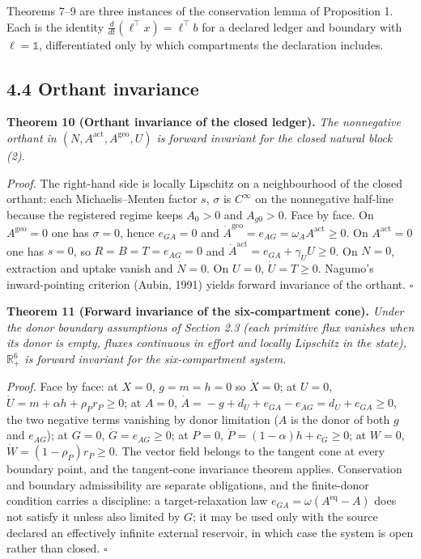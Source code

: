 \documentclass[11pt]{article}
\begin{document}
Theorems 7--9 are three instances of the conservation lemma of Proposition 1. Each is the identity \(\tfrac{d}{dt}(\ell^{\top}x)=\allowbreak{}\ell^{\top}b\) for a declared ledger and boundary with \(\ell=\mathbb 1\), differentiated only by which compartments the declaration includes.

\subsection*{4.4 Orthant invariance}\label{44-orthant-invariance}

\textbf{Theorem 10 (Orthant invariance of the closed ledger).} \emph{The nonnegative orthant in \((N,\allowbreak{} A^{\mathrm{act}},\allowbreak{} A^{\mathrm{geo}},\allowbreak{} U)\) is forward invariant for the closed natural block (2).}

\emph{Proof.} The right-hand side is locally Lipschitz on a neighbourhood of the closed orthant: each Michaelis--Menten factor \(s\), \(\sigma\) is \(C^\infty\) on the nonnegative half-line because the registered regime keeps \(A_0 > 0\) and \(A_{g0} > 0\). Face by face. On \(A^{\mathrm{geo}} = 0\) one has \(\sigma = 0\), hence \(e_{GA} = 0\) and \(\dot A^{\mathrm{geo}} =\allowbreak{} e_{AG} =\allowbreak{} \omega_A A^{\mathrm{act}} \ge 0\). On \(A^{\mathrm{act}} = 0\) one has \(s = 0\), so \(R = B = T = e_{AG} = 0\) and \(\dot A^{\mathrm{act}} =\allowbreak{} e_{GA} +\allowbreak{} \gamma_U U \ge 0\). On \(N = 0\), extraction and uptake vanish and \(\dot N = 0\). On \(U = 0\), \(\dot U = T \ge 0\). Nagumo's inward-pointing criterion (Aubin, 1991) yields forward invariance of the orthant. \(\square\)

\textbf{Theorem 11 (Forward invariance of the six-compartment cone).} \emph{Under the donor boundary assumptions of Section 2.3 (each primitive flux vanishes when its donor is empty, fluxes continuous in effort and locally Lipschitz in the state), \(\mathbb{R}^6_+\) is forward invariant for the six-compartment system.}

\emph{Proof.} Face by face: at \(X = 0\), \(g = m = h = 0\) so \(\dot X = 0\); at \(U = 0\), \(\dot U =\allowbreak{} m +\allowbreak{} \alpha h +\allowbreak{} \rho_P r_P \ge 0\); at \(A = 0\), \(\dot A =\allowbreak{} -g +\allowbreak{} d_U +\allowbreak{} e_{GA} - e_{AG} =\allowbreak{} d_U +\allowbreak{} e_{GA} \ge 0\), the two negative terms vanishing by donor limitation (\(A\) is the donor of both \(g\) and \(e_{AG}\)); at \(G = 0\), \(\dot G = e_{AG} \ge 0\); at \(P = 0\), \(\dot P =\allowbreak{} (1-\alpha)h +\allowbreak{} c_G \ge 0\); at \(W = 0\), \(\dot W = (1-\rho_P)r_P \ge 0\). The vector field belongs to the tangent cone at every boundary point, and the tangent-cone invariance theorem applies. Conservation and boundary admissibility are separate obligations, and the finite-donor condition carries a discipline: a target-relaxation law \(e_{GA} =\allowbreak{} \omega(A^{\mathrm{eq}} - A)\) does not satisfy it unless also limited by \(G\); it may be used only with the source declared an effectively infinite external reservoir, in which case the system is open rather than closed. \(\square\)
\end{document}
